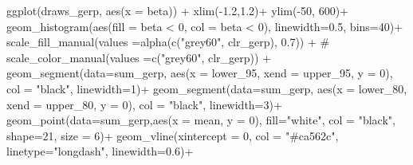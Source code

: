 \documentclass[
  letterpaper,
  DIV=11,
  numbers=noendperiod]{scrreprt}
\newenvironment{Shaded}{}{}
\newcommand{\AttributeTok}[1]{\textcolor[rgb]{0.84,0.23,0.29}{#1}}
\newcommand{\CommentTok}[1]{\textcolor[rgb]{0.42,0.45,0.49}{#1}}
\newcommand{\DecValTok}[1]{\textcolor[rgb]{0.00,0.36,0.77}{#1}}
\newcommand{\FloatTok}[1]{\textcolor[rgb]{0.00,0.36,0.77}{#1}}
\newcommand{\FunctionTok}[1]{\textcolor[rgb]{0.44,0.26,0.76}{#1}}
\newcommand{\NormalTok}[1]{\textcolor[rgb]{0.14,0.16,0.18}{#1}}
\newcommand{\SpecialCharTok}[1]{\textcolor[rgb]{0.00,0.36,0.77}{#1}}
\newcommand{\StringTok}[1]{\textcolor[rgb]{0.01,0.18,0.38}{#1}}
\begin{document}
\begin{Shaded}
\begin{Highlighting}[]
\FunctionTok{ggplot}\NormalTok{(draws\_gerp, }\FunctionTok{aes}\NormalTok{(}\AttributeTok{x =}\NormalTok{ beta)) }\SpecialCharTok{+} 
  \FunctionTok{xlim}\NormalTok{(}\SpecialCharTok{{-}}\FloatTok{1.2}\NormalTok{,}\FloatTok{1.2}\NormalTok{)}\SpecialCharTok{+}
  \FunctionTok{ylim}\NormalTok{(}\SpecialCharTok{{-}}\DecValTok{50}\NormalTok{, }\DecValTok{600}\NormalTok{)}\SpecialCharTok{+}
  \FunctionTok{geom\_histogram}\NormalTok{(}\FunctionTok{aes}\NormalTok{(}\AttributeTok{fill =}\NormalTok{ beta }\SpecialCharTok{\textless{}} \DecValTok{0}\NormalTok{, }\AttributeTok{col =}\NormalTok{ beta }\SpecialCharTok{\textless{}} \DecValTok{0}\NormalTok{), }\AttributeTok{linewidth=}\FloatTok{0.5}\NormalTok{, }\AttributeTok{bins=}\DecValTok{40}\NormalTok{)}\SpecialCharTok{+}
  \FunctionTok{scale\_fill\_manual}\NormalTok{(}\AttributeTok{values =}\FunctionTok{alpha}\NormalTok{(}\FunctionTok{c}\NormalTok{(}\StringTok{"grey60"}\NormalTok{, clr\_gerp), }\FloatTok{0.7}\NormalTok{)) }\SpecialCharTok{+} \CommentTok{\#}
  \FunctionTok{scale\_color\_manual}\NormalTok{(}\AttributeTok{values =}\FunctionTok{c}\NormalTok{(}\StringTok{"grey60"}\NormalTok{, clr\_gerp)) }\SpecialCharTok{+}
  \FunctionTok{geom\_segment}\NormalTok{(}\AttributeTok{data=}\NormalTok{sum\_gerp, }\FunctionTok{aes}\NormalTok{(}\AttributeTok{x =}\NormalTok{ lower\_95, }
                             \AttributeTok{xend =}\NormalTok{ upper\_95, }
                             \AttributeTok{y =} \DecValTok{0}\NormalTok{), }\AttributeTok{col =} \StringTok{"black"}\NormalTok{, }\AttributeTok{linewidth=}\DecValTok{1}\NormalTok{)}\SpecialCharTok{+}
  \FunctionTok{geom\_segment}\NormalTok{(}\AttributeTok{data=}\NormalTok{sum\_gerp, }\FunctionTok{aes}\NormalTok{(}\AttributeTok{x =}\NormalTok{ lower\_80, }
                             \AttributeTok{xend =}\NormalTok{ upper\_80, }
                             \AttributeTok{y =} \DecValTok{0}\NormalTok{), }\AttributeTok{col =} \StringTok{"black"}\NormalTok{, }\AttributeTok{linewidth=}\DecValTok{3}\NormalTok{)}\SpecialCharTok{+}
  \FunctionTok{geom\_point}\NormalTok{(}\AttributeTok{data=}\NormalTok{sum\_gerp,}\FunctionTok{aes}\NormalTok{(}\AttributeTok{x =}\NormalTok{ mean, }\AttributeTok{y =} \DecValTok{0}\NormalTok{), }\AttributeTok{fill=}\StringTok{"white"}\NormalTok{,  }\AttributeTok{col =} \StringTok{"black"}\NormalTok{, }\AttributeTok{shape=}\DecValTok{21}\NormalTok{, }\AttributeTok{size =} \DecValTok{6}\NormalTok{)}\SpecialCharTok{+}
  \FunctionTok{geom\_vline}\NormalTok{(}\AttributeTok{xintercept =} \DecValTok{0}\NormalTok{, }\AttributeTok{col =} \StringTok{"\#ca562c"}\NormalTok{, }\AttributeTok{linetype=}\StringTok{"longdash"}\NormalTok{, }\AttributeTok{linewidth=}\FloatTok{0.6}\NormalTok{)}\SpecialCharTok{+}

\end{Highlighting}
\end{Shaded}
\end{document}
